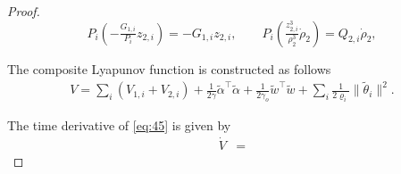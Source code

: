 \documentclass[pdflatex,sn-mathphys-num]{sn-jnl}%
\theoremstyle{thmstyleone}%
\theoremstyle{thmstyletwo}%
\theoremstyle{thmstylethree}%
\begin{document}
\begin{proof}
\[
P_i\!\left(-\tfrac{G_{1,i}}{P_i}z_{2,i}\right)=-G_{1,i}z_{2,i},\qquad
P_i\!\left(\tfrac{z_{2,i}^3}{\rho_{2}^3}\dot\rho_{2}\right)=Q _{2,i}\dot\rho_{2},
\]


The composite Lyapunov function is constructed as follows
\begin{equation}\label{eq:45}
	\begin{aligned}
		V= \sum_i(V_{1,i}+V_{2,i})+\tfrac{1}{2\gamma}\tilde\alpha^\top \tilde\alpha+\tfrac{1}{2\gamma_o}\tilde w^\top\tilde w+\sum_i\tfrac{1}{2\varrho_i}\|\tilde\theta_i\|^2.
	\end{aligned}
\end{equation}

The time derivative of \cref{eq:45} is given by
\begin{equation}\label{eq:46}
	\begin{aligned}
		\dot{V}  & =
	\end{aligned}
\end{equation}



\end{proof}
\end{document}
